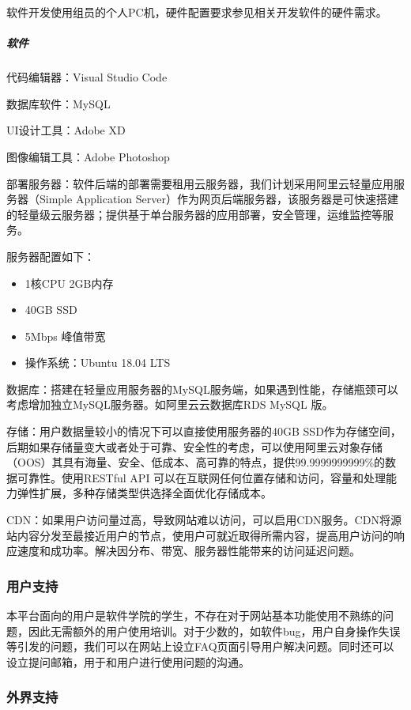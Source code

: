 \documentclass[
]{article}
\begin{document}
软件开发使用组员的个人PC机，硬件配置要求参见相关开发软件的硬件需求。

\hypertarget{header-n3689}{%
\subparagraph{软件}\label{header-n3689}}

代码编辑器：Visual Studio Code

数据库软件：MySQL

UI设计工具：Adobe XD

图像编辑工具：Adobe Photoshop

部署服务器：软件后端的部署需要租用云服务器，我们计划采用阿里云轻量应用服务器（Simple
Application
Server）作为网页后端服务器，该服务器是可快速搭建的轻量级云服务器；提供基于单台服务器的应用部署，安全管理，运维监控等服务。

服务器配置如下：

\begin{itemize}
\item
  1核CPU 2GB内存
\item
  40GB SSD
\item
  5Mbps 峰值带宽
\item
  操作系统：Ubuntu 18.04 LTS
\end{itemize}

数据库：搭建在轻量应用服务器的MySQL服务端，如果遇到性能，存储瓶颈可以考虑增加独立MySQL服务器。如阿里云云数据库RDS
MySQL 版。

存储：用户数据量较小的情况下可以直接使用服务器的40GB
SSD作为存储空间，后期如果存储量变大或者处于可靠、安全性的考虑，可以使用阿里云对象存储（OOS）其具有海量、安全、低成本、高可靠的特点，提供99.9999999999\%的数据可靠性。使用RESTful
API
可以在互联网任何位置存储和访问，容量和处理能力弹性扩展，多种存储类型供选择全面优化存储成本。

CDN：如果用户访问量过高，导致网站难以访问，可以启用CDN服务。CDN将源站内容分发至最接近用户的节点，使用户可就近取得所需内容，提高用户访问的响应速度和成功率。解决因分布、带宽、服务器性能带来的访问延迟问题。

\hypertarget{header-n3705}{%
\subsubsection{用户支持}\label{header-n3705}}

本平台面向的用户是软件学院的学生，不存在对于网站基本功能使用不熟练的问题，因此无需额外的用户使用培训。对于少数的，如软件bug，用户自身操作失误等引发的问题，我们可以在网站上设立FAQ页面引导用户解决问题。同时还可以设立提问邮箱，用于和用户进行使用问题的沟通。

\hypertarget{header-n3707}{%
\subsubsection{外界支持}\label{header-n3707}}
\end{document}
